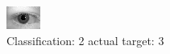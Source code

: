 \begin{figure}[h!]
\begin{center}
\includegraphics[width=0.60\columnwidth]{figures/ID649_class_2_target_3.png}
\end{center}
\caption{ Classification: 2 actual target: 3}
\label{fig:ID649_class_2_target_3}
\end{figure}
